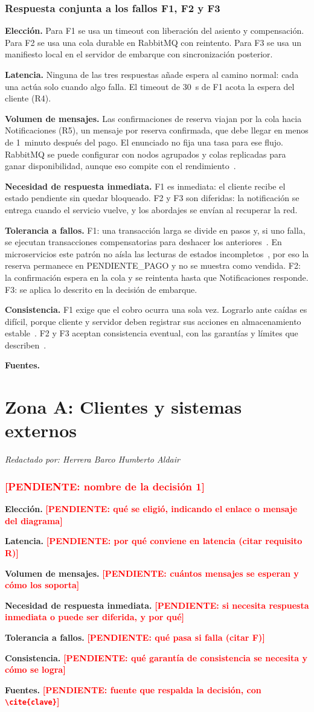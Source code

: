 \documentclass[11pt,a4paper]{article}
\newcommand{\pendiente}[1]{\textbf{\textcolor{red}{[PENDIENTE: #1]}}}
\newcommand{\autor}[1]{\par{\small\textit{Redactado por: #1}}\par}
\newcommand{\decision}[8]{\subsubsection*{#1}%
  \textbf{Elección.} #2\par
  \textbf{Latencia.} #3\par
  \textbf{Volumen de mensajes.} #4\par
  \textbf{Necesidad de respuesta inmediata.} #5\par
  \textbf{Tolerancia a fallos.} #6\par
  \textbf{Consistencia.} #7\par
  \textbf{Fuentes.} #8\par}
\newcommand{\integranteA}{Herrera Barco Humberto Aldair}
\begin{document}
\decision{Respuesta conjunta a los fallos F1, F2 y F3}
 {Para F1 se usa un timeout con liberación del asiento y compensación. Para F2 se usa una cola durable en RabbitMQ con reintento. Para F3 se usa un manifiesto local en el servidor de embarque con sincronización posterior.}
 {Ninguna de las tres respuestas añade espera al camino normal: cada una actúa solo cuando algo falla. El timeout de 30~s de F1 acota la espera del cliente (R4).}
 {Las confirmaciones de reserva viajan por la cola hacia Notificaciones (R5), un mensaje por reserva confirmada, que debe llegar en menos de 1~minuto después del pago. El enunciado no fija una tasa para ese flujo. RabbitMQ se puede configurar con nodos agrupados y colas replicadas para ganar disponibilidad, aunque eso compite con el rendimiento~\cite{rostanski2014rabbitmq}.}
 {F1 es inmediata: el cliente recibe el estado pendiente sin quedar bloqueado. F2 y F3 son diferidas: la notificación se entrega cuando el servicio vuelve, y los abordajes se envían al recuperar la red.}
 {F1: una transacción larga se divide en pasos y, si uno falla, se ejecutan transacciones compensatorias para deshacer los anteriores~\cite{garciamolina1987sagas}. En microservicios este patrón no aísla las lecturas de estados incompletos~\cite{daraghmi2022saga}, por eso la reserva permanece en PENDIENTE\_PAGO y no se muestra como vendida. F2: la confirmación espera en la cola y se reintenta hasta que Notificaciones responde. F3: se aplica lo descrito en la decisión de embarque.}
 {F1 exige que el cobro ocurra una sola vez. Lograrlo ante caídas es difícil, porque cliente y servidor deben registrar sus acciones en almacenamiento estable~\cite{ivaki2012exactlyonce}. F2 y F3 aceptan consistencia eventual, con las garantías y límites que describen~\cite{bailis2013eventual}.}
 {\cite{garciamolina1987sagas,daraghmi2022saga,ivaki2012exactlyonce,rostanski2014rabbitmq,bailis2013eventual}}
 

\section{Zona A: Clientes y sistemas externos}\label{sec:zonaA}
\autor{\integranteA}

\decision{\pendiente{nombre de la decisión 1}}
 {\pendiente{qué se eligió, indicando el enlace o mensaje del diagrama}}
 {\pendiente{por qué conviene en latencia (citar requisito R)}}
 {\pendiente{cuántos mensajes se esperan y cómo los soporta}}
 {\pendiente{si necesita respuesta inmediata o puede ser diferida, y por qué}}
 {\pendiente{qué pasa si falla (citar F)}}
 {\pendiente{qué garantía de consistencia se necesita y cómo se logra}}
 {\pendiente{fuente que respalda la decisión, con \texttt{\textbackslash cite\{clave\}}}}
\end{document}
